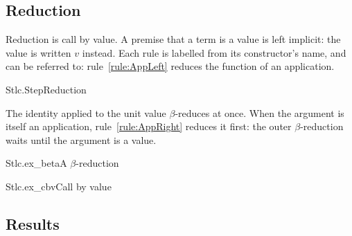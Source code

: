 \documentclass{article}
\makeatletter
\newcommand\val{v}
\newcommand\rulelabel[2]{\def\@currentlabel{#2}\label{rule:#1}}
\makeatother
\begin{document}
\subsection{Reduction}

Reduction is call by value. A premise that a term is a value is left
implicit: the value is written $\val$ instead. Each rule is labelled from its
constructor's name, and can be referred to: rule~\ref{rule:AppLeft}
reduces the function of an application.

\begin{leanrules}[sum=V5YXLse5tR]{Stlc.Step}{Reduction}
\end{leanrules}

The identity applied to the unit value $\beta$-reduces at once. When the
argument is itself an application, rule~\ref{rule:AppRight} reduces it first:
the outer $\beta$-reduction waits until the argument is a value.

\begin{leanexample}[sum=iLycR2llh0]{Stlc.ex_beta}{A $\beta$-reduction}
\label{ex:Stlc.ex_beta}
\end{leanexample}

\begin{leanexample}[sum=Au9X2TsAWI]{Stlc.ex_cbv}{Call by value}
\label{ex:Stlc.ex_cbv}
\end{leanexample}

\subsection{Results}
\end{document}
